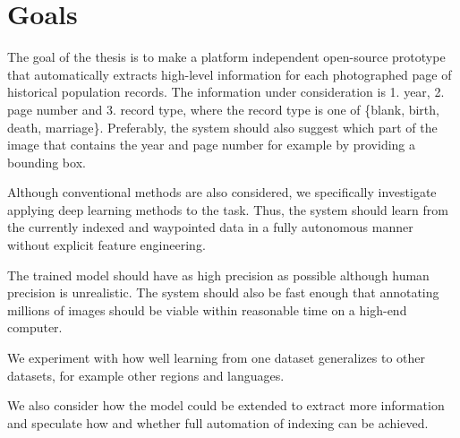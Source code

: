 \section{Goals}


The goal of the thesis is to make a platform independent open-source prototype that automatically extracts high-level information for each photographed page of historical population records. The information under consideration is 1. year, 2. page number and 3. record type, where the record type is one of \{blank, birth, death, marriage\}. Preferably, the system should also suggest which part of the image that contains the year and page number for example by providing a bounding box.

Although conventional methods are also considered, we specifically investigate applying deep learning methods to the task.
Thus, the system should learn from the currently indexed and waypointed data in a fully autonomous manner without explicit feature engineering.

The trained model should have as high precision as possible although human precision is unrealistic. The system should also be fast enough that annotating millions of images should be viable within reasonable time on a high-end computer.


We experiment with how well learning from one dataset generalizes to other datasets, for example other regions and languages.

We also consider how the model could be extended to extract more information and speculate how and whether full automation of indexing can be achieved.

